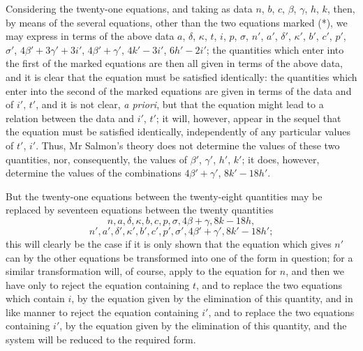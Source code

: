 \documentclass[11pt,a4paper]{book}
\theoremstyle{plain}
\begin{document}
Considering the twenty-one equations, and taking as data $n$, $b$, $c$, $\beta$, $\gamma$, $h$, $k$, then, by means of the several equations, other than the two equations marked (*), we may express in terms of the above data $a$, $\delta$, $\kappa$, $t$, $i$, $p$, $\sigma$, $n'$, $a'$, $\delta'$, $\kappa'$, $b'$, $c'$, $p'$, $\sigma'$, $4\beta'+3\gamma'+3i'$, $4\beta'+\gamma'$, $4k'-3i'$, $6h'-2i'$; the quantities which enter into the first of the marked equations are then all given in terms of the above data, and it is clear that the equation must be satisfied identically: the quantities which enter into the second of the marked equations are given in terms of the data and of $i'$, $t'$, and it is not clear, \textit{a priori}, but that the equation might lead to a relation between the data and $i'$, $t'$; it will, however, appear in the sequel that the equation must be satisfied identically, independently of any particular values of $t'$, $i'$. Thus, Mr Salmon's theory does not determine the values of these two quantities, nor, consequently, the values of $\beta'$, $\gamma'$, $h'$, $k'$; it does, however, determine the values of the combinations $4\beta'+\gamma'$, $8k'-18h'$.

But the twenty-one equations between the twenty-eight quantities may be replaced by seventeen equations between the twenty quantities
\[
n,a,\delta,\kappa,b,c,p,\sigma,4\beta+\gamma,8k-18h,
\]
\[
n',a',\delta',\kappa',b',c',p',\sigma',4\beta'+\gamma',8k'-18h';
\]
this will clearly be the case if it is only shown that the equation which gives $n'$ can by the other equations be transformed into one of the form in question; for a similar transformation will, of course, apply to the equation for $n$, and then we have only to reject the equation containing $t$, and to replace the two equations which contain $i$, by the equation given by the elimination of this quantity, and in like manner to reject the equation containing $i'$, and to replace the two equations containing $i'$, by the equation given by the elimination of this quantity, and the system will be reduced to the required form.
\end{document}
